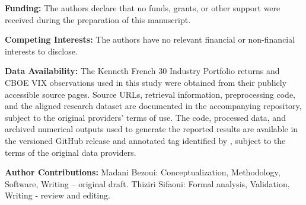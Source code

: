 \documentclass[smallextended]{svjour3}
\begin{document}
\textbf{Funding:} The authors declare that no funds, grants, or other support were received during the preparation of this manuscript.

\textbf{Competing Interests:} The authors have no relevant financial or non-financial interests to disclose.

\textbf{Data Availability:} The Kenneth French 30 Industry Portfolio returns \cite{french2026data} and CBOE VIX observations \cite{cboe2026vix} used in this study were obtained from their publicly accessible source pages. Source URLs, retrieval information, preprocessing code, and the aligned research dataset are documented in the accompanying repository, subject to the original providers' terms of use. The code, processed data, and archived numerical outputs used to generate the reported results are available in the versioned GitHub release and annotated tag identified by \citet{bezoui2026robust}, subject to the terms of the original data providers.

\textbf{Author Contributions:} Madani Bezoui: Conceptualization, Methodology, Software, Writing -- original draft. Thiziri Sifaoui: Formal analysis, Validation, Writing - review and editing.


\end{document}
